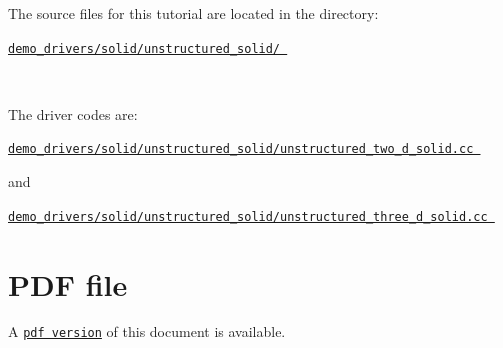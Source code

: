 \begin{DoxyItemize}
\item The source files for this tutorial are located in the directory\+:~\newline
~\newline
\begin{center} \href{../../../../demo_drivers/solid/unstructured_solid/}{\tt demo\+\_\+drivers/solid/unstructured\+\_\+solid/ } \end{center} ~\newline

\item The driver codes are\+: ~\newline
~\newline
\begin{center} \href{../../../../demo_drivers/solid/unstructured_solid/unstructured_two_d_solid.cc}{\tt demo\+\_\+drivers/solid/unstructured\+\_\+solid/unstructured\+\_\+two\+\_\+d\+\_\+solid.\+cc } \end{center}  and \begin{center} \href{../../../../demo_drivers/solid/unstructured_solid/unstructured_three_d_solid.cc}{\tt demo\+\_\+drivers/solid/unstructured\+\_\+solid/unstructured\+\_\+three\+\_\+d\+\_\+solid.\+cc } \end{center} 
\end{DoxyItemize}



 

 \hypertarget{index_pdf}{}\section{P\+D\+F file}\label{index_pdf}
A \href{../latex/refman.pdf}{\tt pdf version} of this document is available. 
